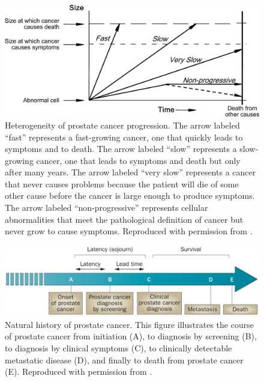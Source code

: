 \begin{figure}
\begin{center}
\includegraphics[width=\linewidth]{figures/heterogeneitypca.jpg}
\end{center}
\caption[Heterogeneity of prostate cancer progression]{Heterogeneity of prostate cancer progression. The arrow labeled ``fast'' represents a fast-growing cancer, one that quickly leads to symptoms and to death. The arrow labeled ``slow'' represents a slow-growing cancer, one that leads to symptoms and death but only after many years. The arrow labeled ``very slow'' represents a cancer that never causes problems because the patient will die of some other cause before the cancer is large enough to produce symptoms. The arrow labeled ``non-progressive'' represents cellular abnormalities that meet the pathological definition of cancer but never grow to cause symptoms. Reproduced with permission from \citet{welch_overdiagnosis_2010}.}
\label{fig:heterogeneitypca}
\end{figure}

\begin{figure}
\begin{center}
\includegraphics[width=\linewidth]{figures/naturalcourse.jpg}
\end{center}
\caption[Natural history of prostate cancer]{Natural history of prostate cancer. This figure illustrates the course of prostate cancer from initiation (A), to diagnosis by screening (B), to diagnosis by clinical symptoms (C), to clinically detectable metastatic disease (D), and finally to death from prostate cancer (E). Reproduced with permission from \citet{salinas_prostate_2014}.}
\label{fig:naturalcourse}
\end{figure}

